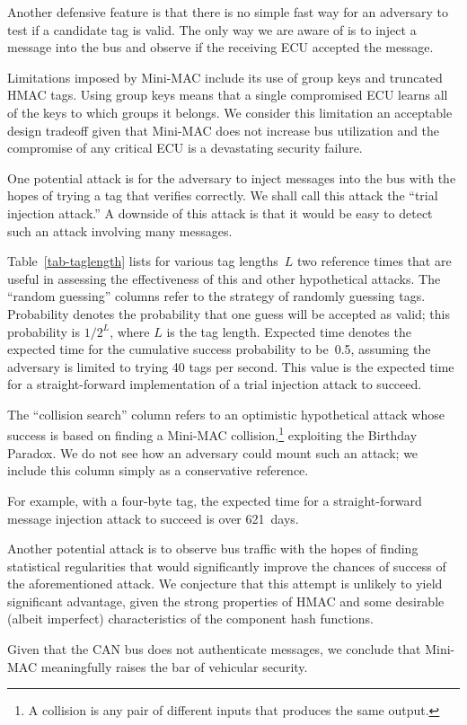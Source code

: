 Another defensive feature is that there is no simple fast way for an adversary to
test if a candidate tag is valid.   The only way we are aware of is to inject a message into the bus
and observe if the receiving ECU accepted the message.

Limitations imposed by Mini-MAC include its use of group keys and truncated HMAC tags.  
Using group keys means that a single compromised ECU learns all of the keys
to which groups it belongs.  We consider this limitation an acceptable design tradeoff
given that Mini-MAC does not increase bus utilization and the compromise of any critical
ECU is a devastating security failure.

One potential attack is for the adversary to inject messages into the bus with the hopes
of trying a tag that verifies correctly.  We shall call this attack the ``trial injection attack.''
A downside of this attack is that it would be easy to detect such an attack involving
many messages.

Table~\ref{tab-taglength} lists for various tag lengths~$L$
two reference times that are useful in assessing the effectiveness of this and other hypothetical attacks.
The ``random guessing'' columns refer to the strategy of randomly guessing tags.
Probability denotes the probability that one guess will be accepted as valid; this probability
is $1/2^{L}$, where $L$ is the tag length.
Expected time denotes the expected time for the cumulative success probability to be~0.5,
assuming the adversary is limited to trying 40 tags per second.
This value is the expected time for a straight-forward 
implementation of a trial injection attack to succeed.  

The ``collision search'' column refers to an optimistic hypothetical attack whose success is based on
finding a Mini-MAC collision,\footnote{A collision is any pair of 
different inputs that produces the same output.}
exploiting the Birthday Paradox.  
We do not see how an adversary could mount such an attack;
we include this column simply as a conservative reference.

For example, with a four-byte tag, the expected time for a straight-forward 
message injection attack to succeed is over 621~days.  

Another potential attack is to observe bus traffic with the hopes of finding statistical
regularities that would significantly improve the chances of success of the aforementioned attack.
We conjecture that this attempt is unlikely to yield significant advantage, given the
strong properties of HMAC and some
desirable (albeit imperfect) characteristics of the component hash functions.

Given that the CAN bus does not authenticate messages, we conclude that Mini-MAC
meaningfully raises the bar of vehicular security.


	
